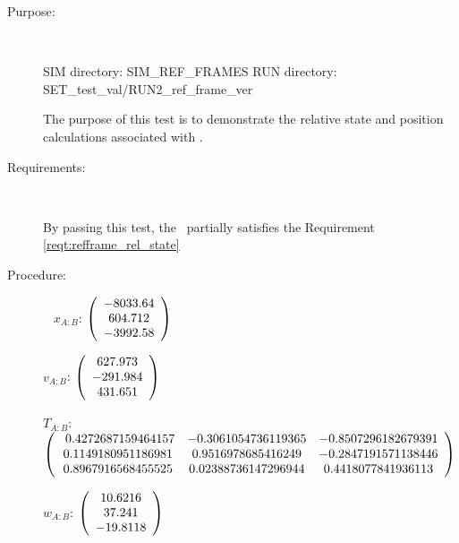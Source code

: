 \label{test:refframe_test_2}
\begin{description}
\item[Purpose:] \ \newline

SIM directory: SIM\_REF\_FRAMES
RUN directory: SET\_test\_val/RUN2\_ref\_frame\_ver

The purpose of this test is to demonstrate the relative state and
position calculations associated with .

\item[Requirements:] \ \newline

By passing this test, the \ partially satisfies
the Requirement \ref{reqt:refframe_rel_state}

\item[Procedure:] \ \newline
$x_{A:B}$:  $\left( \begin{array} {ccc} -8033.64 \\    604.712 \\   -3992.58
\end{array} \right)\\ \\$

$v_{A:B}$:   $\left( \begin{array} {ccc}  627.973 \\   -291.984 \\    431.651
\end{array} \right)\\ \\$

$T_{A:B}$:   $\left( \begin{array} {ccc}\
0.4272687159464157 & -0.3061054736119365 & -0.8507296182679391 \\
0.1149180951186981 & 0.9516978685416249 & -0.2847191571138446 \\
0.8967916568455525 & 0.02388736147296944 & 0.4418077841936113
\end{array} \right)\\ \\$

$w_{A:B}$:   $\left( \begin{array} {ccc}
10.6216 \\     37.241 \\   -19.8118
\end{array} \right)\\ \\$


\end{description}
